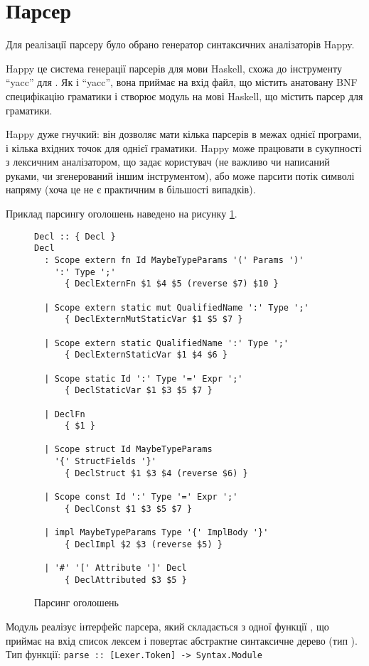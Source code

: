 \documentclass[main.tex]{subfiles}
\begin{document}
\FloatBarrier
\section{Парсер}
Для реалізації парсеру було обрано генератор синтаксичних аналізаторів Happy\cite{happy}.

Happy це система генерації парсерів для мови Haskell, схожа до інструменту ``yacc'' для \LangC{}.
Як і ``yacc'', вона приймає на вхід файл, що містить анатовану BNF специфікацію граматики і створює модуль на мові Haskell, що містить парсер для граматики.

Happy дуже гнучкий: він дозволяє мати кілька парсерів в межах однієї програми, і кілька вхідних точок для однієї граматики.
Happy може працювати в сукупності з лексичним аналізатором, що задає користувач (не важливо чи написаний руками, чи згенерований іншим інструментом), або може парсити потік символі напряму (хоча це не є практичним в більшості випадків).

Приклад парсингу оголошень наведено на рисунку \ref{compiler:parse-decls}.

\begin{figure}[h]
  \centering
  \begin{verbatim}
Decl :: { Decl }
Decl
  : Scope extern fn Id MaybeTypeParams '(' Params ')'
    ':' Type ';'
      { DeclExternFn $1 $4 $5 (reverse $7) $10 }

  | Scope extern static mut QualifiedName ':' Type ';'
      { DeclExternMutStaticVar $1 $5 $7 }

  | Scope extern static QualifiedName ':' Type ';'
      { DeclExternStaticVar $1 $4 $6 }

  | Scope static Id ':' Type '=' Expr ';'
      { DeclStaticVar $1 $3 $5 $7 }

  | DeclFn
      { $1 }

  | Scope struct Id MaybeTypeParams
    '{' StructFields '}'
      { DeclStruct $1 $3 $4 (reverse $6) }

  | Scope const Id ':' Type '=' Expr ';'
      { DeclConst $1 $3 $5 $7 }

  | impl MaybeTypeParams Type '{' ImplBody '}'
      { DeclImpl $2 $3 (reverse $5) }

  | '#' '[' Attribute ']' Decl
      { DeclAttributed $3 $5 }
  \end{verbatim}
  \caption{Парсинг оголошень}
  \label{compiler:parse-decls}
\end{figure}

Модуль  реалізує інтерфейс парсера, який складається з одної функції , що приймає на вхід список лексем і повертає абстрактне синтаксичне дерево (тип ). Тип функції: \texttt{parse :: [Lexer.Token] -> Syntax.Module}
\end{document}
